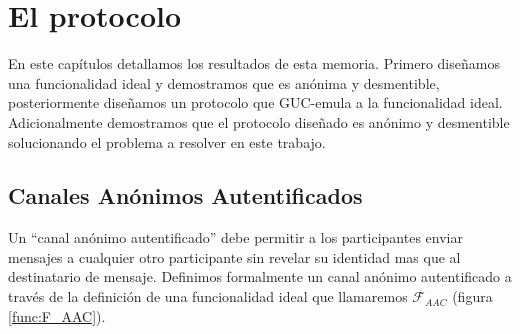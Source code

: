 \chapter{El protocolo}

\label{cap:protocolo}

En este capítulos detallamos los resultados de esta memoria. Primero diseñamos una funcionalidad ideal
y demostramos que es anónima y desmentible, posteriormente diseñamos un protocolo que GUC-emula
a la funcionalidad ideal. Adicionalmente demostramos que el protocolo diseñado es anónimo y desmentible
solucionando el problema a resolver en este trabajo.

\section{Canales Anónimos Autentificados}
Un ``canal anónimo autentificado'' debe permitir a los participantes enviar mensajes a cualquier otro participante
sin revelar su identidad mas que al destinatario de mensaje. Definimos formalmente un canal anónimo autentificado
a través de la definición de una funcionalidad ideal que llamaremos $\mathcal{F}_{AAC}$ (figura \ref{func:F_AAC}).

